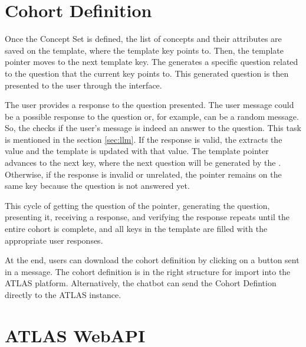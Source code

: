 \section{Cohort Definition}




Once the Concept Set is defined, the list of concepts and their attributes are saved on the template, where the template key points to. Then, the template pointer moves to the next template key. The {\llm} generates a specific question related to the question that the current key points to. This generated question is then presented to the user through the interface.

The user provides a response to the question presented. The user message could be a possible response to the question or, for example, can be a random message. So, the {\llm} checks if the user's message is indeed an answer to the question. This task is mentioned in the section \ref{sec:llm}. If the response is valid, the {\llm} extracts the value and the template is updated with that value. The template pointer advances to the next key, where the next question will be generated by the {\llm}. Otherwise, if the response is invalid or unrelated, the pointer remains on the same key because the question is not answered yet.

This cycle of getting the question of the pointer, generating the question, presenting it, receiving a response, and verifying the response repeats until the entire cohort is complete, and all keys in the template are filled with the appropriate user responses.

At the end, users can download the cohort definition by clicking on a button sent in a message. The cohort definition is in the right structure for import into the ATLAS platform. Alternatively, the chatbot can send the Cohort Defintion directly to the ATLAS instance.


\section{ATLAS WebAPI}

